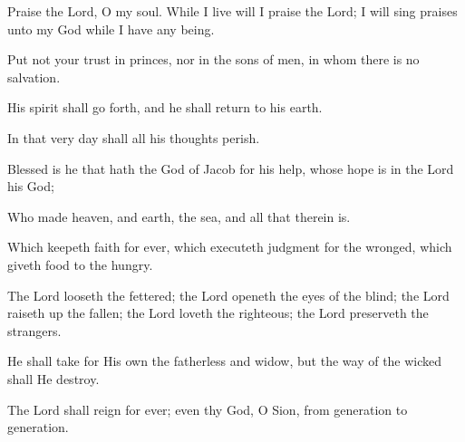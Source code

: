 Praise the Lord, O my soul. While I live will I praise the Lord; I will sing praises unto my God while I have any being.

Put not your trust in princes, nor in the sons of men, in whom there is no salvation.

His spirit shall go forth, and he shall return to his earth.

In that very day shall all his thoughts perish.

Blessed is he that hath the God of Jacob for his help, whose hope is in the Lord his God;

Who made heaven, and earth, the sea, and all that therein is.

Which keepeth faith for ever, which executeth judgment for the wronged, which giveth food to the hungry.

The Lord looseth the fettered; the Lord openeth the eyes of the blind; the Lord raiseth up the fallen; the Lord loveth the righteous; the Lord preserveth the strangers.

He shall take for His own the fatherless and widow, but the way of the wicked shall He destroy.

The Lord shall reign for ever; even thy God, O Sion, from generation to generation.
